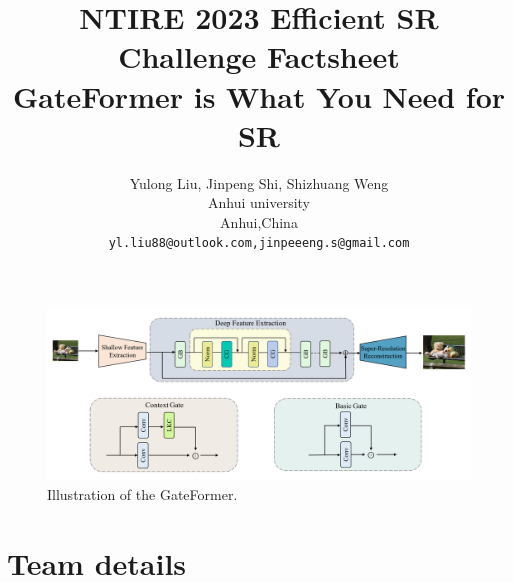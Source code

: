 \documentclass[10pt,twocolumn,letterpaper]{article}
\begin{document}
	
	\title{NTIRE 2023 Efficient SR Challenge Factsheet\\GateFormer is  What You Need for SR}
	
	\author{Yulong Liu, Jinpeng Shi, Shizhuang Weng\\
	Anhui university\\
	Anhui,China\\
	{\tt\small yl.liu88@outlook.com,jinpeeeng.s@gmail.com}
}
\maketitle


\begin{figure}[tph]
	\centering
	\includegraphics[width=1\linewidth]{Image/arch}
	\caption{Illustration of the GateFormer.}
	\label{arch}
\end{figure}



\section{Team details}
\newcommand{\github}[1]{\href{https://github.com/#1/}{github.com/#1}}
\end{document}
